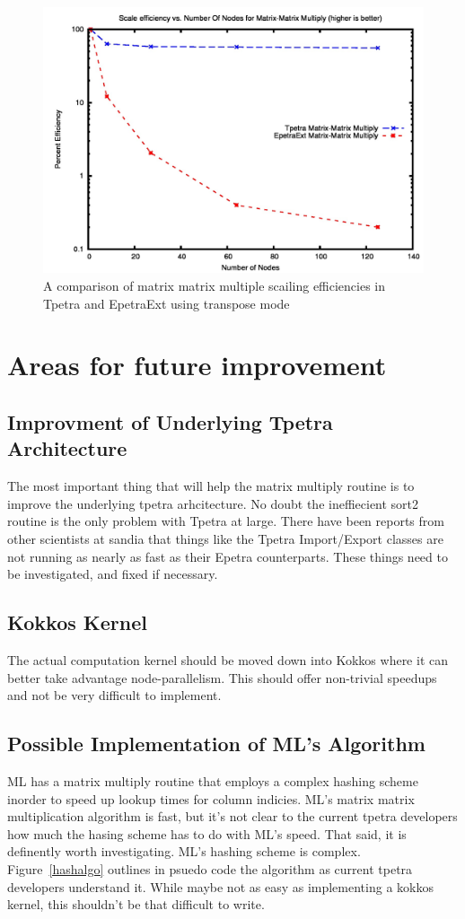 \documentclass{article}
\begin{document}
\begin{figure}
\includegraphics[scale=.4]{atranseff.jpg}
\caption[Efficiency Comparison]{A comparison of matrix matrix multiple scailing efficiencies in Tpetra and EpetraExt using transpose mode}
\label{transeff}
\end{figure}

\section{Areas for future improvement}
\subsection{Improvment of Underlying Tpetra Architecture}
The most important thing that will help the matrix multiply routine is to improve the underlying tpetra arhcitecture. 
No doubt the ineffiecient sort2 routine is the only problem with Tpetra at large. There have been reports from other 
scientists at sandia that things like the Tpetra Import/Export classes are not running as nearly as fast as their Epetra 
counterparts. These things need to be investigated, and fixed if necessary.

\subsection{Kokkos Kernel}
The actual computation kernel should be moved down into Kokkos where it can better take advantage node-parallelism. 
This should offer non-trivial speedups and not be very difficult to implement.

\subsection{Possible Implementation of ML's Algorithm}
ML has a matrix multiply routine that employs a complex hashing scheme inorder to speed up lookup times for 
column indicies. ML's matrix matrix multiplication algorithm is fast, but it's not clear to the current tpetra developers 
how much the hasing scheme has to do with ML's speed. That said, it is definently worth investigating. ML's hashing scheme 
is complex. Figure~\ref{hashalgo} outlines in psuedo code the algorithm as current tpetra developers 
understand it. While maybe not as easy as implementing a kokkos kernel, this shouldn't be that difficult to write.
\end{document}
